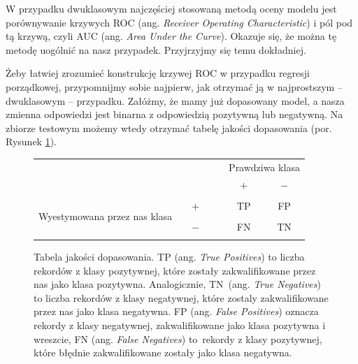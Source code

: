 \documentclass{mini}
\begin{document}
W przypadku dwuklasowym najczęściej stosowaną metodą oceny modelu jest porównywanie krzywych ROC (ang. \textit{Receiver Operating Characteristic}) i pól pod tą krzywą, czyli AUC (ang. \textit{Area Under the Curve}). Okazuje się, że można tę metodę uogólnić na nasz przypadek. Przyjrzyjmy się temu dokładniej. 

Żeby łatwiej zrozumieć konstrukcję krzywej ROC w przypadku regresji porządkowej, przypomnijmy sobie najpierw, jak otrzymać ją w najprostszym -- dwuklasowym -- przypadku. Załóżmy, że mamy już dopasowany model, a nasza zmienna odpowiedzi jest binarna z odpowiedzią pozytywną lub negatywną. Na zbiorze testowym możemy wtedy otrzymać tabelę jakości dopasowania (por. Rysunek \ref{tabeladopasowania}).

\begin{figure}[!h]
		\begin{center}
		\begin{tabular}{c c c c | | c c c} 
			& & & & & \multicolumn{2}{c}{ Prawdziwa klasa}\\ 
			& & & & & $+$ & $-$ \\
			\hline
			\hline
			& & & & & & \\
			\multirow{3}{*}{\parbox{4cm}{\centering  Wyestymowana przez nas klasa}}
			& & $+$ & & & TP & FP\\
			& & & & &\\
			& & $-$ & & & FN & TN\\
			& & & & & &
		\end{tabular}
		\end{center}
	\caption{Tabela jakości dopasowania. TP (ang. \textit{True Positives}) to liczba rekordów z klasy pozytywnej, które zostały zakwalifikowane przez nas jako klasa pozytywna. Analogicznie, TN~(ang. \textit{True Negatives}) to liczba rekordów z klasy negatywnej, które zostaly zakwalifikowane przez nas jako klasa negatywna. FP (ang. \textit{False Positives}) oznacza rekordy z klasy negatywnej, zakwalifikowane jako klasa pozytywna i wreszcie, FN (ang. \textit{False Negatives}) to~rekordy z klasy pozytywnej, które błędnie zakwalifikowane zostały jako klasa negatywna.}
\label{tabeladopasowania}	
\end{figure}
\end{document}
